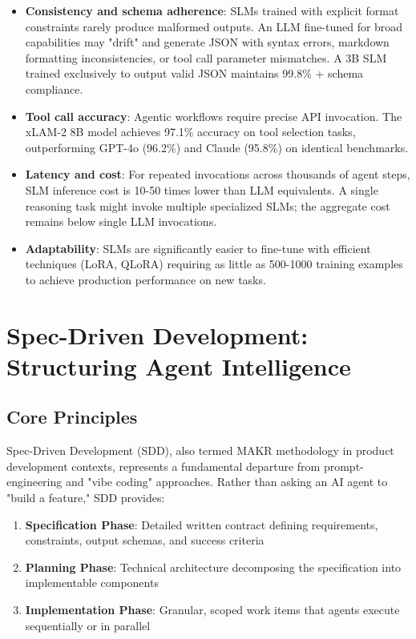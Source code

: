 \documentclass[11pt,a4paper]{article}
\begin{document}
\begin{itemize}
\item \textbf{Consistency and schema adherence}: SLMs trained with explicit format constraints rarely produce malformed outputs. An LLM fine-tuned for broad capabilities may "drift" and generate JSON with syntax errors, markdown formatting inconsistencies, or tool call parameter mismatches. A 3B SLM trained exclusively to output valid JSON maintains 99.8\% + schema compliance\cite{nvidia2025}.

\item \textbf{Tool call accuracy}: Agentic workflows require precise API invocation. The xLAM-2 8B model achieves 97.1\% accuracy on tool selection tasks, outperforming GPT-4o (96.2\%) and Claude (95.8\%) on identical benchmarks\cite{belcak2025}.

\item \textbf{Latency and cost}: For repeated invocations across thousands of agent steps, SLM inference cost is 10-50 times lower than LLM equivalents. A single reasoning task might invoke multiple specialized SLMs; the aggregate cost remains below single LLM invocations\cite{belcak2025}.

\item \textbf{Adaptability}: SLMs are significantly easier to fine-tune with efficient techniques (LoRA, QLoRA) requiring as little as 500-1000 training examples to achieve production performance on new tasks\cite{nvidia2025}.
\end{itemize}

\section{Spec-Driven Development: Structuring Agent Intelligence}

\subsection{Core Principles}
Spec-Driven Development (SDD), also termed MAKR methodology in product development contexts, represents a fundamental departure from prompt-engineering and "vibe coding" approaches\cite{jetbrains2025}. Rather than asking an AI agent to "build a feature," SDD provides:

\begin{enumerate}
    \item \textbf{Specification Phase}: Detailed written contract defining requirements, constraints, output schemas, and success criteria
    \item \textbf{Planning Phase}: Technical architecture decomposing the specification into implementable components
    \item \textbf{Implementation Phase}: Granular, scoped work items that agents execute sequentially or in parallel\cite{jetbrains2025}
\end{enumerate}
\end{document}

